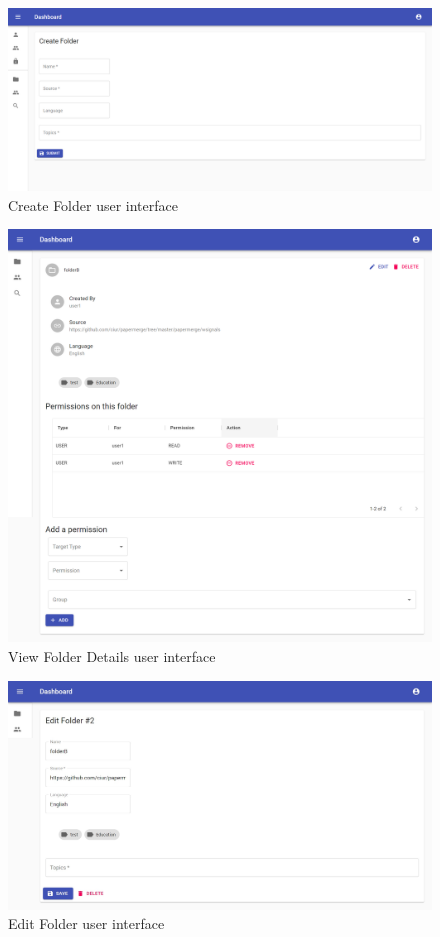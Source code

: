 \begin{figure}[H]
    \centering
    \includegraphics[width=1.0\textwidth]{images/Folder-Create.png}
    \caption{Create Folder user interface}
    \label{fig:createFolder}
\end{figure}
\begin{figure}[H]
    \centering
    \includegraphics[width=1.0\textwidth]{images/Folder-ViewDetails.png}
    \caption{View Folder Details user interface}
    \label{fig:viewFolder}
\end{figure}
\begin{figure}[H]
    \centering
    \includegraphics[width=1.0\textwidth]{images/Folder-Edit.jpg}
    \caption{Edit Folder user interface}
    \label{fig:editFolder}
\end{figure}
